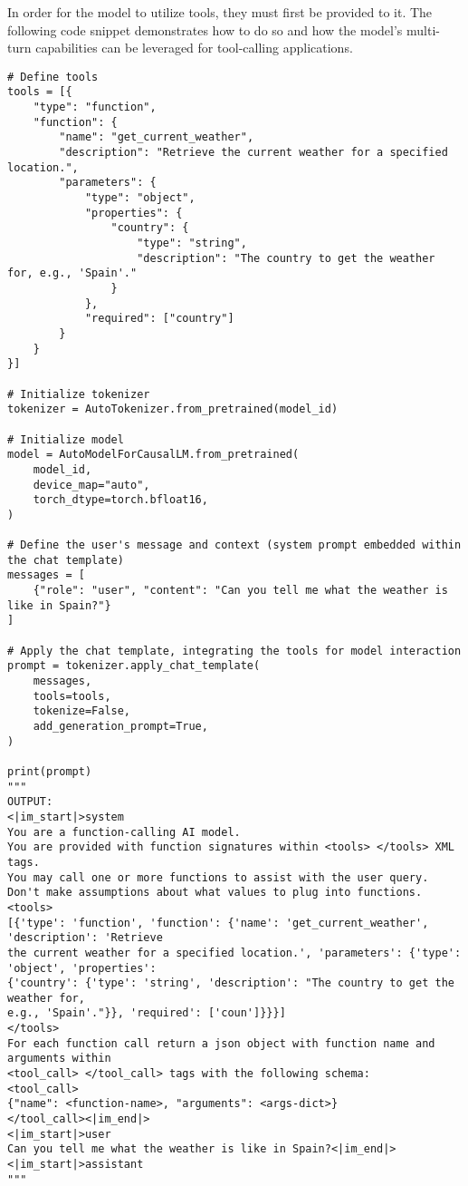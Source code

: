 In order for the model to utilize tools, they must first be provided to it. The following code snippet demonstrates how to do so and how the model's multi-turn capabilities can be leveraged for tool-calling applications.

\begin{verbatim}
# Define tools
tools = [{
    "type": "function",
    "function": {
        "name": "get_current_weather",
        "description": "Retrieve the current weather for a specified location.",
        "parameters": {
            "type": "object",
            "properties": {
                "country": {
                    "type": "string",
                    "description": "The country to get the weather for, e.g., 'Spain'."
                }
            },
            "required": ["country"]
        }
    }
}]

# Initialize tokenizer
tokenizer = AutoTokenizer.from_pretrained(model_id)

# Initialize model
model = AutoModelForCausalLM.from_pretrained(
    model_id, 
    device_map="auto", 
    torch_dtype=torch.bfloat16,
)

# Define the user's message and context (system prompt embedded within the chat template)
messages = [
    {"role": "user", "content": "Can you tell me what the weather is like in Spain?"}
]

# Apply the chat template, integrating the tools for model interaction
prompt = tokenizer.apply_chat_template(
    messages,
    tools=tools,
    tokenize=False,
    add_generation_prompt=True,
)

print(prompt)
"""
OUTPUT:
<|im_start|>system
You are a function-calling AI model.
You are provided with function signatures within <tools> </tools> XML tags. 
You may call one or more functions to assist with the user query.
Don't make assumptions about what values to plug into functions.
<tools>
[{'type': 'function', 'function': {'name': 'get_current_weather', 'description': 'Retrieve 
the current weather for a specified location.', 'parameters': {'type': 'object', 'properties': 
{'country': {'type': 'string', 'description': "The country to get the weather for, 
e.g., 'Spain'."}}, 'required': ['coun']}}}]
</tools>
For each function call return a json object with function name and arguments within 
<tool_call> </tool_call> tags with the following schema:
<tool_call>
{"name": <function-name>, "arguments": <args-dict>}
</tool_call><|im_end|>
<|im_start|>user
Can you tell me what the weather is like in Spain?<|im_end|>
<|im_start|>assistant
"""


\end{verbatim}
